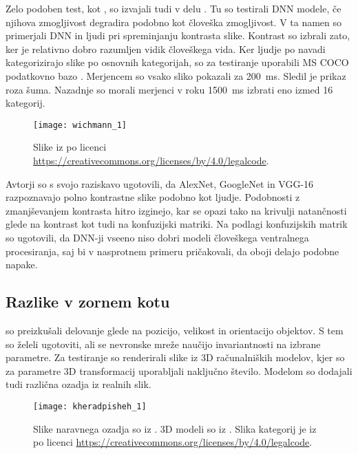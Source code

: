 Zelo podoben test, kot \cite{geirhos2017comparing}, so izvajali tudi v delu \cite{wichmann2017methods}. Tu so testirali DNN modele, če njihova zmogljivost degradira podobno kot človeška zmogljivost. V ta namen so primerjali DNN in ljudi pri spreminjanju kontrasta slike. Kontrast so izbrali zato, ker je relativno dobro razumljen vidik človeškega vida. Ker ljudje po navadi kategorizirajo slike po osnovnih kategorijah, so za testiranje uporabili MS COCO podatkovno bazo \cite{?}. Merjencem so vsako sliko pokazali za \SI{200}{\ms}. Sledil je prikaz roza šuma. Nazadnje so morali merjenci v roku \SI{1500}{\ms} izbrati eno izmed 16 kategorij.

\begin{figure}[!htbp]
	\centering
	\texttt{[image: wichmann\_1]}
	\caption{Slike iz \cite{geirhos2017image} po licenci \url{https://creativecommons.org/licenses/by/4.0/legalcode}.}
\end{figure}

Avtorji so s svojo raziskavo ugotovili, da AlexNet, GoogleNet in VGG-16 razpoznavajo polno kontrastne slike podobno kot ljudje. Podobnosti z zmanjševanjem kontrasta hitro izginejo, kar se opazi tako na krivulji natančnosti glede na kontrast kot tudi na konfuzijski matriki. Na podlagi konfuzijskih matrik so ugotovili, da DNN-ji vseeno niso dobri modeli človeškega ventralnega procesiranja, saj bi v nasprotnem primeru pričakovali, da oboji delajo podobne napake.


\subsection{Razlike v zornem kotu}
 so preizkušali delovanje glede na pozicijo, velikost in orientacijo objektov. S tem so želeli ugotoviti, ali se nevronske mreže naučijo invariantnosti na izbrane parametre. Za testiranje so renderirali slike iz 3D računalniških modelov, kjer so za parametre 3D transformacij uporabljali naključno število. Modelom so dodajali tudi različna ozadja iz realnih slik. 

\begin{figure}[!htbp]
	\centering
	\texttt{[image: kheradpisheh\_1]}
	\caption{Slike naravnega ozadja so iz \cite{xiao2010sun}. 3D modeli so iz \cite{oreilly2013recurrent}. Slika kategorij je iz \cite{geirhos2017image} po licenci  \url{https://creativecommons.org/licenses/by/4.0/legalcode}.}
\end{figure}

